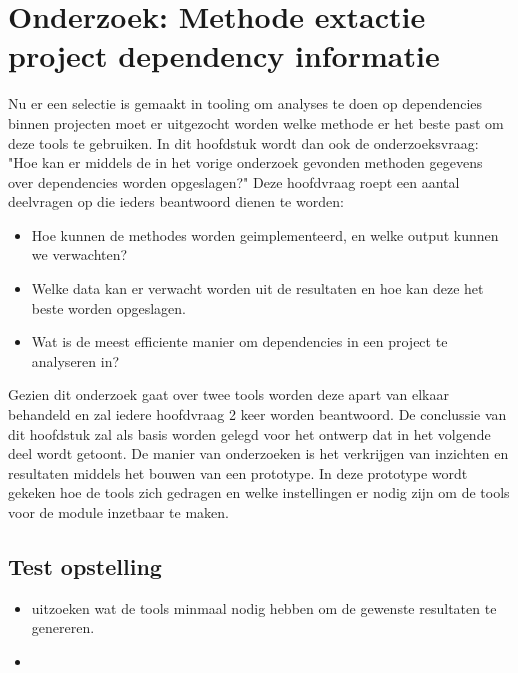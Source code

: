 
\chapter{Onderzoek: Methode extactie project dependency informatie}\label{ch:onderzoek:-methode-extactie-project-dependency-informatie}

Nu er een selectie is gemaakt in tooling om analyses te doen op dependencies binnen projecten moet er uitgezocht worden welke methode er het beste past om deze tools te gebruiken. In dit hoofdstuk wordt dan ook de onderzoeksvraag: "Hoe kan er middels de in het vorige onderzoek gevonden methoden gegevens over dependencies worden opgeslagen?"
Deze hoofdvraag roept een aantal deelvragen op die ieders beantwoord dienen te worden:
\begin{itemize}
    \item Hoe kunnen de methodes worden geimplementeerd, en welke output kunnen we verwachten?
    \item Welke data kan er verwacht worden uit de resultaten en hoe kan deze het beste worden opgeslagen.
    \item Wat is de meest efficiente manier om dependencies in een project te analyseren in?
\end{itemize}
Gezien dit onderzoek gaat over twee tools worden deze apart van elkaar behandeld en zal iedere hoofdvraag 2 keer worden beantwoord. De conclussie van dit hoofdstuk zal als basis worden gelegd voor het ontwerp dat in het volgende deel wordt getoont. De manier van onderzoeken is het verkrijgen van inzichten en resultaten middels het bouwen van een prototype. In deze prototype wordt gekeken hoe de tools zich gedragen en welke instellingen er nodig zijn om de tools voor de module inzetbaar te maken.

\section{Test opstelling}\label{sec:test-opstelling}
\begin{itemize}
    \item uitzoeken wat de tools  minmaal nodig hebben om de gewenste resultaten te genereren.
    \item
\end{itemize}



